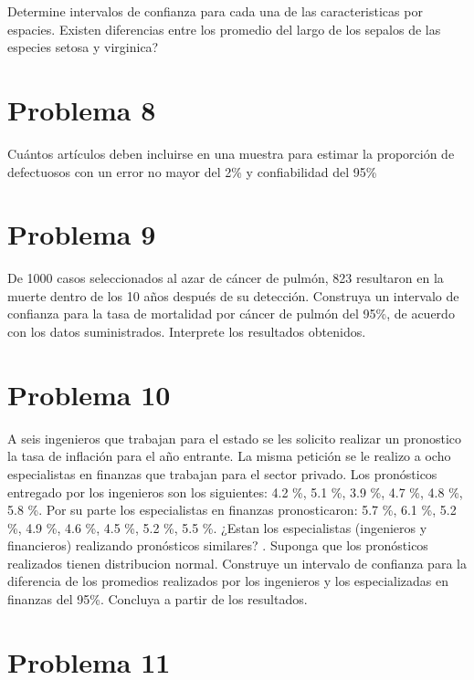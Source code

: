\documentclass[
]{article}
\begin{document}
Determine intervalos de confianza para cada una de las caracteristicas
por espacies. Existen diferencias entre los promedio del largo de los
sepalos de las especies setosa y virginica?

\hypertarget{problema-8}{%
\section{\texorpdfstring{\textbf{Problema
8}}{Problema 8}}\label{problema-8}}

Cuántos artículos deben incluirse en una muestra para estimar la
proporción de defectuosos con un error no mayor del 2\% y confiabilidad
del 95\%

\hypertarget{problema-9}{%
\section{\texorpdfstring{\textbf{Problema
9}}{Problema 9}}\label{problema-9}}

De 1000 casos seleccionados al azar de cáncer de pulmón, 823 resultaron
en la muerte dentro de los 10 años después de su detección. Construya un
intervalo de confianza para la tasa de mortalidad por cáncer de pulmón
del 95\%, de acuerdo con los datos suministrados. Interprete los
resultados obtenidos.

\hypertarget{problema-10}{%
\section{\texorpdfstring{\textbf{Problema
10}}{Problema 10}}\label{problema-10}}

A seis ingenieros que trabajan para el estado se les solicito realizar
un pronostico la tasa de inflación para el año entrante. La misma
petición se le realizo a ocho especialistas en finanzas que trabajan
para el sector privado. Los pronósticos entregado por los ingenieros son
los siguientes: 4.2 \%, 5.1 \%, 3.9 \%, 4.7 \%, 4.8 \%, 5.8 \%. Por su
parte los especialistas en finanzas pronosticaron: 5.7 \%, 6.1 \%, 5.2
\%, 4.9 \%, 4.6 \%, 4.5 \%, 5.2 \%, 5.5 \%. ¿Estan los especialistas
(ingenieros y financieros) realizando pronósticos similares? . Suponga
que los pronósticos realizados tienen distribucion normal. Construye un
intervalo de confianza para la diferencia de los promedios realizados
por los ingenieros y los especializadas en finanzas del 95\%. Concluya a
partir de los resultados.

\hypertarget{problema-11}{%
\section{\texorpdfstring{\textbf{Problema
11}}{Problema 11}}\label{problema-11}}
\end{document}
